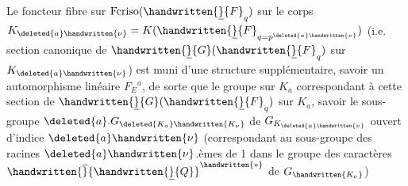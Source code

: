 Le foncteur fibre  sur $\operatorname{Fcriso}(\handwritten{\underline}{F}_q)$  sur le corps $K_{\deleted{a}\handwritten{\nu}}=K(\handwritten{\underline}{F}_{q=p^{\deleted{a}\handwritten{\nu}}})$ 
(i.e. section canonique de $\handwritten{\underline}{G}(\handwritten{\underline}{F}_q)$ sur $K_{\deleted{a}\handwritten{\nu}}$) est muni d'une structure supplémentaire, savoir un automorphisme linéaire $F_E{}^a$, de sorte que le groupe  sur  $K_a$ correspondant à cette section de $\handwritten{\underline}{G}(\handwritten{\underline}{F}_q)$ sur $K_a$, savoir le sous-groupe $\deleted{a}.G_{\deleted{K_a}\handwritten{K_\nu}}$ de $G_{K_{\deleted{a}\handwritten{\nu}}}$ ouvert d'indice $\deleted{a}\handwritten{\nu}$ (correspondant au sous-groupe des racines $\deleted{a}\handwritten{\nu}$.èmes de 1 dans le groupe des caractères $\handwritten{\overline}{\handwritten{\underline}{Q}}^{\handwritten{*}}$ de $G_{\handwritten{K_\nu}}$)

